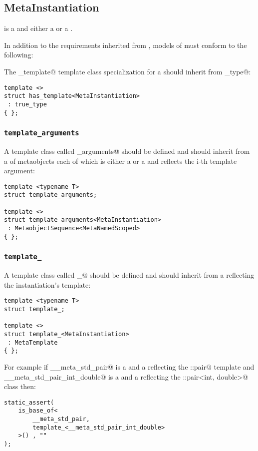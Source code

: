 \subsection{MetaInstantiation}
\label{concept-MetaInstantiation}

 is a  and either a  or a .

In addition to the requirements inherited from ,
models of  must conform to the following:

The \verb@has_template@ template class specialization for a  should
inherit from \verb@true_type@:

\begin{verbatim}
template <>
struct has_template<MetaInstantiation>
 : true_type
{ };
\end{verbatim}

\subsubsection{\texttt{template\_arguments}}

A template class called \verb@template_arguments@ should be defined and should
inherit from a  of  metaobjects
each of which is either a  or a  and reflects
the i-th template argument:

\begin{verbatim}
template <typename T>
struct template_arguments;

template <>
struct template_arguments<MetaInstantiation>
 : MetaobjectSequence<MetaNamedScoped>
{ };
\end{verbatim}

\subsubsection{\texttt{template\_}}

A template class called \verb@template_@ should be defined and should
inherit from a  reflecting the instantiation's template:

\begin{verbatim}
template <typename T>
struct template_;

template <>
struct template_<MetaInstantiation>
 : MetaTemplate
{ };
\end{verbatim}

For example if \verb@__meta_std_pair@ is a  and a  reflecting
the \verb@std::pair@ template and \verb@__meta_std_pair_int_double@ is a 
and a  reflecting the \verb@std::pair<int, double>@ class then:

\begin{verbatim}
static_assert(
	is_base_of<
		__meta_std_pair,
		template_<__meta_std_pair_int_double>
	>() , ""
);
\end{verbatim}
